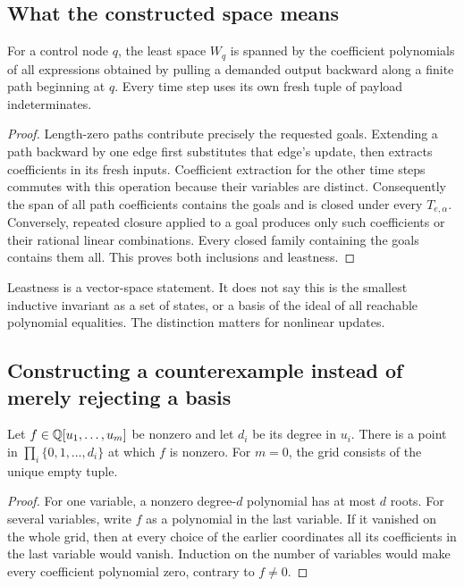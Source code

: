 \subsection{What the constructed space means}
\begin{lemma}\label{lem:path}
For a control node $q$, the least space $W_q$ is spanned by the coefficient
polynomials of all expressions obtained by pulling a demanded output backward
along a finite path beginning at $q$. Every time step uses its own fresh tuple
of payload indeterminates.
\end{lemma}
\begin{proof}
Length-zero paths contribute precisely the requested goals. Extending a path
backward by one edge first substitutes that edge's update, then extracts
coefficients in its fresh inputs. Coefficient extraction for the other time
steps commutes with this operation because their variables are distinct.
Consequently the span of all path coefficients contains the goals and is
closed under every $T_{e,\alpha}$. Conversely, repeated closure applied to a
goal produces only such coefficients or their rational linear combinations.
Every closed family containing the goals contains them all. This proves both
inclusions and leastness.
\end{proof}

Leastness is a vector-space statement. It does not say this is the smallest
inductive invariant as a set of states, or a basis of the ideal of all reachable
polynomial equalities. The distinction matters for nonlinear updates.

\subsection{Constructing a counterexample instead of merely rejecting a basis}
\begin{lemma}\label{lem:grid}
Let $f\in\mathbb Q[u_1,\ldots,u_m]$ be nonzero and let $d_i$ be its degree in $u_i$.
There is a point in $\prod_i\{0,1,\ldots,d_i\}$ at which $f$ is nonzero.
For $m=0$, the grid consists of the unique empty tuple.
\end{lemma}
\begin{proof}
For one variable, a nonzero degree-$d$ polynomial has at most $d$ roots. For
several variables, write $f$ as a polynomial in the last variable. If it
vanished on the whole grid, then at every choice of the earlier coordinates
all its coefficients in the last variable would vanish. Induction on the
number of variables would make every coefficient polynomial zero, contrary to
$f\ne0$.
\end{proof}

